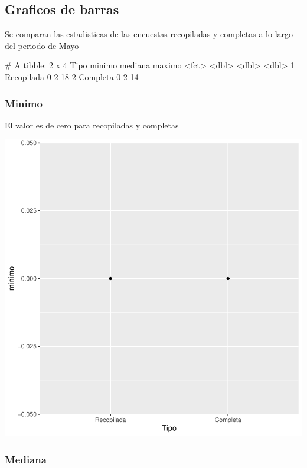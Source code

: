 \documentclass{article}
\begin{document}
\subsection{Graficos de barras}
Se comparan las estadisticas de las encuestas recopiladas y completas a lo largo del periodo de Mayo

\begin{Schunk}
\begin{Soutput}
# A tibble: 2 x 4
  Tipo       minimo mediana maximo
  <fct>       <dbl>   <dbl>  <dbl>
1 Recopilada      0       2     18
2 Completa        0       2     14
\end{Soutput}
\end{Schunk}

\subsubsection{Minimo}
El valor es de cero para recopiladas y completas

\includegraphics{seguimento2-079}

\subsubsection{Mediana}
\end{document}
